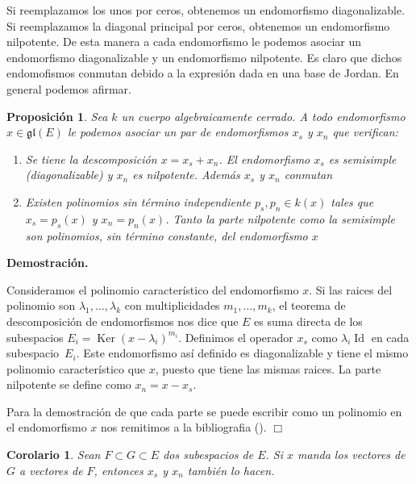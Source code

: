\documentclass[a4paper,draft,12pt]{scrartcl}
\newtheorem{propo}[teo]{Proposición}%
\newtheorem{cor}[teo]{Corolario}%
\newcommand{\dem}{\noindent \textbf{Demostración. }\vspace{0.3 cm}}%
\newcommand{\fin}{ $\Box $ \vspace{0.4 cm}}
\DeclareMathOperator{\Ker}{Ker}%
\DeclareMathOperator{\Id}{Id}%
\begin{document}
Si reemplazamos los  unos por ceros, obtenemos un endomorfismo diagonalizable.  Si reemplazamos la diagonal principal por ceros, obtenemos un endomorfismo nilpotente. De esta manera a cada endomorfismo le podemos asociar un endomorfismo diagonalizable y un endomorfismo nilpotente.  Es claro que dichos endomofismos conmutan debido a la expresión dada en una base de Jordan. En general podemos afirmar.

\begin{propo}
Sea $k$ un cuerpo algebraicamente cerrado.
 A todo endomorfismo $x \in \mathfrak{gl}(E)$ le podemos asociar un par de endomorfismos $x_s$ y $x_n$ que verifican:
 
 \begin{enumerate}[\indent 1.- ]
 
 \item Se tiene la descomposición $x= x_s+x_n$. El endomorfismo $x_s$ es semisimple (diagonalizable) y $x_n$ es nilpotente. Además $x_s$ y $x_n$ conmutan
 
 \item Existen polinomios  sin término independiente $p_s, p_n \in k(x)$ tales que $x_s = p_s(x)$ y $x_n= p_n(x)$.  Tanto la parte nilpotente como la semisimple son polinomios, sin término constante, del endomorfismo $x$
 
 \end{enumerate}
 
 \end{propo}


\dem

Consideramos el polinomio característico del endomorfismo $x$.  Si las raices del polinomio son $\lambda_1, \dots, \lambda_k$ con multiplicidades $m_1,\dots,m_k$, el teorema de descomposición de endomorfismos nos dice que $E$ es suma directa de los sub\-espacios $E_i = \Ker(x-\lambda_i)^{m_i}$.  Definimos el operador $x_s$ como $\lambda_i\Id$ en cada subespacio~$E_i$.  Este endomorfismo así definido es diagonalizable y tiene el mismo polinomio característico que $x$, puesto que tiene las mismas raices.  La parte nilpotente se define como $x_n= x-x_s$.

\bigskip

Para la demostración de que cada parte se puede escribir como un polinomio en el endomorfismo $x$ nos remitimos a la bibliografia (\cite{humint}).  \fin


\begin{cor}

Sean $F \subset G \subset E$ dos subespacios de $E$.  Si $x$ manda los vectores de $G$ a vectores de $F$, entonces $x_s$ y $x_n$ también lo hacen.

\end{cor}
\end{document}
